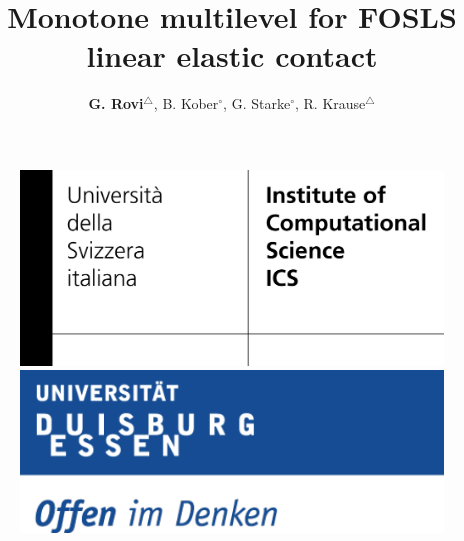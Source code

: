 \documentclass[8pt, oneside]{beamer}   	%
\title{ \textcolor{dkgrey}{  \textbf{Monotone multilevel for FOSLS linear elastic contact} }}
\author{\textcolor{dkgrey}{\textbf{G. Rovi}$^\bigtriangleup$, B. Kober$^\circ$, G. Starke$^\circ$, R. Krause$^\bigtriangleup$}}
\institute{$\circ$: Universit\"at Duisburg\,-\,Essen, Germany \\ 
$\bigtriangleup$: Universit\aaa~della Svizzera italiana, Switzerland}
\begin{document}
 \begin{frame}
\titlepage
\begin{figure}[htbp!]
	\includegraphics[scale=0.7]{img/logo_ics}
	\quad
		\includegraphics[scale=0.3]{img/essenlogo}
\end{figure}
\end{frame}








 
\end{document}
